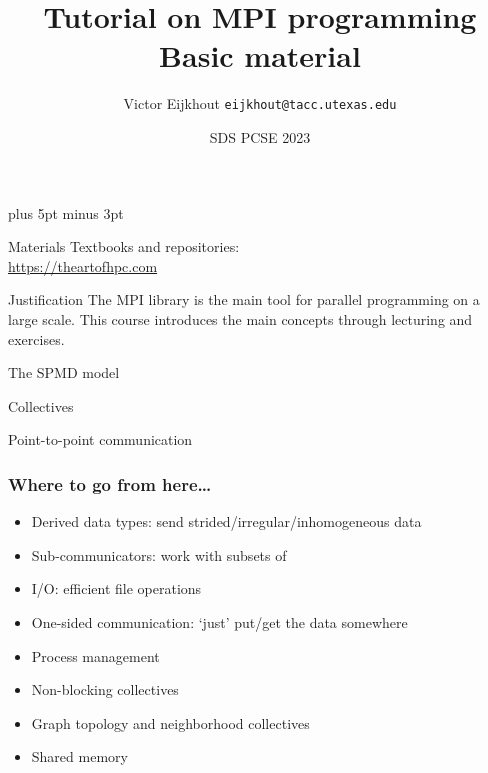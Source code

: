 \documentclass[11pt,headernav]{beamer}
\def\Location{}%
\def\courseyear{2023}
\def\Location{SDS PCSE \courseyear}
\def\TitleExtra{\\ Basic material}
\begin{document}
\parskip=10pt plus 5pt minus 3pt

\title{Tutorial on MPI programming\TitleExtra}
\author{Victor Eijkhout {\tt eijkhout@tacc.utexas.edu}}
\date{\Location}

\begin{frame}
  \titlepage
\end{frame}

\begin{frame}[containsverbatim]{Materials}
    Textbooks and repositories:\\
    \url{https://theartofhpc.com}
\end{frame}

\begin{frame}{Justification}
  The MPI library is the main tool
  for parallel programming on a large scale.
  This course introduces the main concepts
  through lecturing and exercises.
\end{frame}



\renewcommand\standardversion{3}

 {The SPMD model}


 {Collectives}


 {Point-to-point communication}


\iffalse
\begin{exerciseframe}[serialsend]
  
\end{exerciseframe}
\fi

\begin{frame}[containsverbatim]\frametitle{Where to go from here\ldots}
  \begin{itemize}
  \item Derived data types: send strided/irregular/inhomogeneous data
  \item Sub-communicators: work with subsets of 
  \item I/O: efficient file operations
  \item One-sided communication: `just' put/get the data somewhere
  \item Process management
  \item Non-blocking collectives
  \item Graph topology and neighborhood collectives
  \item Shared memory
  \end{itemize}
\end{frame}

\renewcommand\standardversion{}
\end{document}
